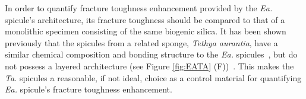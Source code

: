 \documentclass[12pt,onecolumn]{article}
\makeatletter
\newcommand{\TA}{\textit{Ta.\@}\xspace}
\newcommand{\EA}{\textit{Ea.\@}\xspace}
\makeatother
\begin{document}

In order to quantify fracture toughness enhancement provided by the \EA spicule's architecture, its fracture toughness should be compared to that of a monolithic specimen consisting of the same biogenic silica. It has been shown previously that the spicules from a related sponge, \textit{Tethya aurantia}, have a similar chemical composition and bonding structure to the \EA spicules~\cite{weaver2010unifying}, but do not possess a layered architecture (see Figure \ref{fig:EATA} (F))~\cite{monn2017new}. This makes the \TA spicules a reasonable, if not ideal, choice as a control material for quantifying \EA spicule's fracture toughness enhancement. 
%


\end{document}
